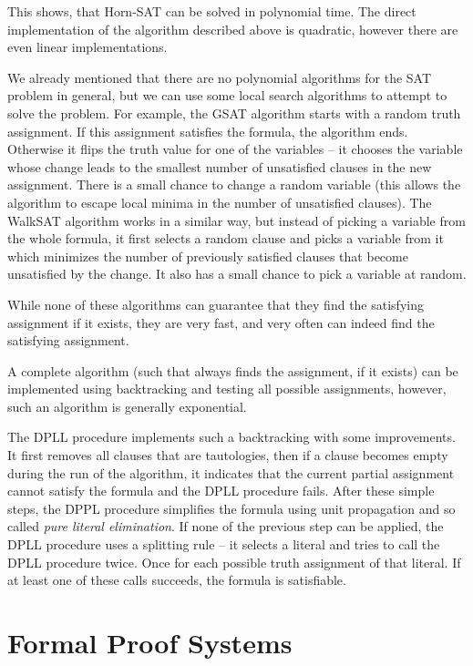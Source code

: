 This shows, that Horn-SAT can be solved in polynomial time. The direct implementation of the algorithm described above is quadratic, however there are even linear implementations.

We already mentioned that there are no polynomial algorithms for the SAT problem in general, but we can use some local search algorithms to attempt to solve the problem. For example, the GSAT algorithm starts with a random truth assignment. If this assignment satisfies the formula, the algorithm ends. Otherwise it flips the truth value for one of the variables -- it chooses the variable whose change leads to the smallest number of unsatisfied clauses in the new assignment. There is a small chance to change a random variable (this allows the algorithm to escape local minima in the number of unsatisfied clauses). The WalkSAT algorithm works in a similar way, but instead of picking a variable from the whole formula, it first selects a random clause and picks a variable from it which minimizes the number of previously satisfied clauses that become unsatisfied by the change. It also has a small chance to pick a variable at random. 

While none of these algorithms can guarantee that they find the satisfying assignment if it exists, they are very fast, and very often can indeed find the satisfying assignment.

A complete algorithm (such that always finds the assignment, if it exists) can be implemented using backtracking and testing all possible assignments, however, such an algorithm is generally exponential. 

The DPLL procedure implements such a backtracking with some improvements. It first removes all clauses that are tautologies, then if a clause becomes empty during the run of the algorithm, it indicates that the current partial assignment cannot satisfy the formula and the DPLL procedure fails. After these simple steps, the DPPL procedure simplifies the formula using unit propagation and so called \emph{pure literal elimination}. If none of the previous step can be applied, the DPLL procedure uses a splitting rule -- it selects a literal and tries to call the DPLL procedure twice. Once for each possible truth assignment of that literal. If at least one of these calls succeeds, the formula is satisfiable.

\chapter{Formal Proof Systems}

